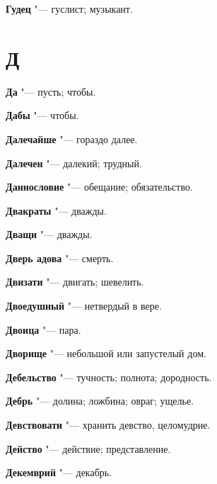 \begin{mymulticols}{2}
\noindent\textbf{Гудец} "--- гуслист; музыкант. 




\section{Д} 





\noindent\textbf{Да} "--- пусть; чтобы. 




\noindent\textbf{Дабы} "--- чтобы. 




\noindent\textbf{Далечайше} "--- гораздо далее. 




\noindent\textbf{Далечен} "--- далекий; трудный. 




\noindent\textbf{Даннословие} "--- обещание; обязательство. 




\noindent\textbf{Двакраты} "--- дважды. 




\noindent\textbf{Дващи} "--- дважды. 




\noindent\textbf{Дверь адова} "--- смерть. 




\noindent\textbf{Двизати} "--- двигать; шевелить. 




\noindent\textbf{Двоедушный} "--- нетвердый в вере. 




\noindent\textbf{Двоица} "--- пара. 




\noindent\textbf{Дворище} "--- небольшой или запустелый дом. 




\noindent\textbf{Дебельство} "--- тучность; полнота; дородность. 




\noindent\textbf{Дебрь} "--- долина; ложбина; овраг; ущелье. 




\noindent\textbf{Девствовати} "--- хранить девство, целомудрие. 




\noindent\textbf{Действо} "--- действие; представление. 




\noindent\textbf{Декемврий} "--- декабрь. 





\end{mymulticols}
